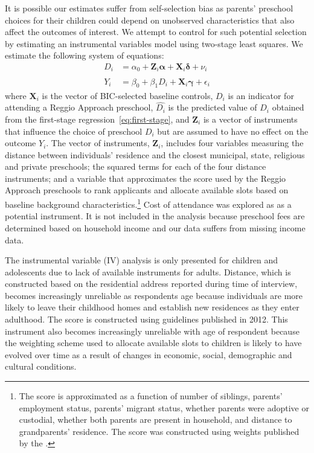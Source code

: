 It is possible our estimates suffer from self-selection bias as parents' preschool choices for their children could depend on unobserved characteristics that also affect the outcomes of interest. We attempt to control for such potential selection by estimating an instrumental variables model using two-stage least squares. We estimate the following system of equations:
\begin{align}
D_i &= \alpha_0 + \bm{Z}_i \bm{\alpha} + \bm{X}_i \bm{\delta} + \nu_i \label{eq:first-stage}\\
Y_i &= \beta_0 + \beta_1 \hat{D_i} + \bm{X}_i \bm{\gamma} + \epsilon_i \label{eq:second-stage}
\end{align}
where %
$\bm{X}_i$ is the vector of BIC-selected baseline controls, $D_i$ is an indicator for attending a Reggio Approach preschool, $\hat{D_i}$ is the predicted value of $D_i$ obtained from the first-stage regression~\eqref{eq:first-stage}, and $\bm{Z}_i$ is a vector of instruments that influence the choice of preschool $D_i$ but are assumed to have no effect on the outcome $Y_i$. The vector of instruments, $\bm{Z}_i$, includes four variables measuring the distance between individuals' residence and the closest municipal, state, religious and private preschools; the squared terms for each of the four distance instruments; and a variable that approximates the score used by the Reggio Approach preschools to rank applicants and allocate available slots based on baseline background characteristics.\footnote{The score is approximated as a function of number of siblings, parents' employment status, parents' migrant status, whether parents were adoptive or custodial, whether both parents are present in household, and distance to grandparents' residence. The score was constructed using weights published by the \citet{Reggio-Emilia_2012_Criteria-admission-2013-14}.} Cost of attendance was explored as as a potential instrument. It is not included in the analysis because preschool fees are determined based on household income and our data suffers from missing income data.

The instrumental variable (IV) analysis is only presented for children and adolescents due to lack of available instruments for adults. Distance, which is constructed based on the residential address reported during time of interview, becomes increasingly unreliable as respondents age because individuals are more likely to leave their childhood homes and establish new residences as they enter adulthood. The score is constructed using guidelines published in 2012. This instrument also becomes increasingly unreliable with age of respondent because the weighting scheme used to allocate available slots to children is likely to have evolved over time as a result of changes in economic, social, demographic and cultural conditions.

